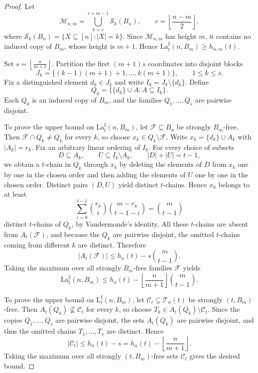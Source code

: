 \documentclass[10pt,a4paper]{amsart}
\newcommand{\LT}{\mathrm{L}}
\newcommand{\LaT}{\mathrm{La}}
\newcommand{\floor}[1]{\flr{#1}}
\newcommand{\flr}[1]{\left\lfloor #1 \right\rfloor}
\begin{document}
\begin{proof}
Let
\[
\mathcal M_{n,m}
=
\bigcup_{k=r}^{r+m-1}\mathcal S_k(B_n),
\qquad
r=\floor{\frac{n-m}{2}},
\]
where \(\mathcal S_k(B_n)=\{X\subseteq[n]:|X|=k\}\). Since \(\mathcal M_{n,m}\) has height \(m\), it contains no induced copy of \(B_m\), whose height is \(m+1\). Hence
$\LaT_t^\sharp(n,B_m)\ge h_{n,m}(t)$.

Set $s=\floor{\frac{n}{m+1}}$.
Partition the first \((m+1)s\) coordinates into disjoint blocks
\[
J_k=\{(k-1)(m+1)+1,\dots,k(m+1)\},
\qquad 1\le k\le s.
\]
Fix a distinguished element \(d_k\in J_k\) and write \(I_k=J_k\setminus\{d_k\}\). Define
\[
Q_k=\bigl\{\{d_k\}\cup A:A\subseteq I_k\bigr\}.
\]
Each \(Q_k\) is an induced copy of \(B_m\), and the families \(Q_1,\dots,Q_s\) are pairwise disjoint.

To prove the upper bound on \(\LaT_t^\sharp(n,B_m)\), let \(\mathcal F\subseteq B_n\) be strongly \(B_m\)-free. Then \(\mathcal F\cap Q_k\neq Q_k\) for every \(k\), so choose \(x_k\in Q_k\setminus \mathcal F\). Write \(x_k=\{d_k\}\cup A_k\) with \(|A_k|=r_k\). Fix an arbitrary linear ordering of \(I_k\). For every choice of subsets
\[
D\subseteq A_k,\qquad U\subseteq I_k\setminus A_k,\qquad |D|+|U|=t-1,
\]
we obtain a \(t\)-chain in \(Q_k\) through \(x_k\) by deleting the elements of \(D\) from \(x_k\) one by one in the chosen order and then adding the elements of \(U\) one by one in the chosen order. Distinct pairs \((D,U)\) yield distinct \(t\)-chains. Hence \(x_k\) belongs to at least
\[
\sum_{i=0}^{t-1}\binom{r_k}{i}\binom{m-r_k}{t-1-i}
=
\binom{m}{t-1}
\]
distinct \(t\)-chains of \(Q_k\), by Vandermonde's identity.
All these \(t\)-chains are absent from \(A_t(\mathcal F)\), and because the \(Q_k\) are pairwise disjoint, the omitted \(t\)-chains coming from different \(k\) are distinct. Therefore
\[
|A_t(\mathcal F)|\le h_n(t)-s\binom{m}{t-1}.
\]
Taking the maximum over all strongly \(B_m\)-free families \(\mathcal F\) yields
\[
\LaT_t^\sharp(n,B_m)\le h_n(t)-\floor{\frac{n}{m+1}}\binom{m}{t-1}.
\]

To prove the upper bound on \(\LT_t^\sharp(n,B_m)\), let \(\mathcal C_t\subseteq \mathcal T_n(t)\) be strongly \((t,B_m)\)-free. Then \(A_t(Q_k)\nsubseteq \mathcal C_t\) for every \(k\), so choose \(T_k\in A_t(Q_k)\setminus \mathcal C_t\). Since the copies \(Q_1,\dots,Q_s\) are pairwise disjoint, the sets \(A_t(Q_k)\) are pairwise disjoint, and thus the omitted chains \(T_1,\dots,T_s\) are distinct. Hence
\[
|\mathcal C_t|\le h_n(t)-s=h_n(t)-\floor{\frac{n}{m+1}}.
\]
Taking the maximum over all strongly \((t,B_m)\)-free sets \(\mathcal C_t\) gives the desired bound.
\end{proof}
\end{document}

